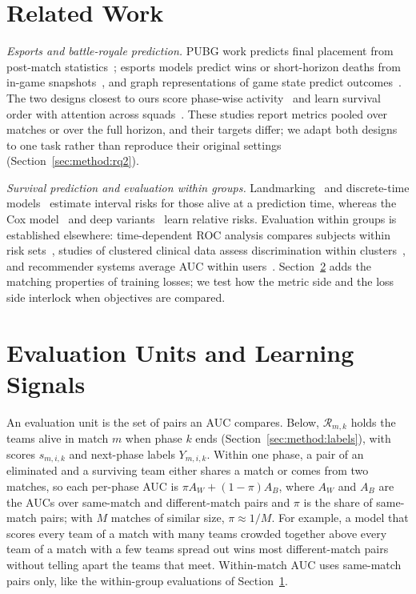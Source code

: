 \documentclass[sigconf,anonymous]{acmart}
\begin{document}
\section{Related Work}
\label{sec:related}
\emph{Esports and battle-royale prediction.} PUBG work predicts final placement from post-match statistics~\cite{KagglePUBG,LeeLee25}; esports models predict wins or short-horizon deaths from in-game snapshots~\cite{Hodge21,Katona19,Marshall22}, and graph representations of game state predict outcomes~\cite{Xenopoulos21}. The two designs closest to ours score phase-wise activity~\cite{Sagong25a} and learn survival order with attention across squads~\cite{KRAFTON}. These studies report metrics pooled over matches or over the full horizon, and their targets differ; we adapt both designs to one task rather than reproduce their original settings (Section~\ref{sec:method:rq2}).

\emph{Survival prediction and evaluation within groups.} Landmarking~\cite{vanHouwelingen07} and discrete-time models~\cite{SingerWillett93,Gensheimer19} estimate interval risks for those alive at a prediction time, whereas the Cox model~\cite{Cox72} and deep variants~\cite{DeepHit18,DynamicDeepHit20} learn relative risks. Evaluation within groups is established elsewhere: time-dependent ROC analysis compares subjects within risk sets~\cite{HeagertyZheng05}, studies of clustered clinical data assess discrimination within clusters~\cite{vanKlaveren14}, and recommender systems average AUC within users~\cite{Zhou18}. Section~\ref{sec:account} adds the matching properties of training losses; we test how the metric side and the loss side interlock when objectives are compared.

\section{Evaluation Units and Learning Signals}
\label{sec:account}
An evaluation unit is the set of pairs an AUC compares. Below, $\mathcal{R}_{m,k}$ holds the teams alive in match $m$ when phase $k$ ends (Section~\ref{sec:method:labels}), with scores $s_{m,i,k}$ and next-phase labels $Y_{m,i,k}$. Within one phase, a pair of an eliminated and a surviving team either shares a match or comes from two matches, so each per-phase AUC is $\pi A_W+(1-\pi)A_B$, where $A_W$ and $A_B$ are the AUCs over same-match and different-match pairs and $\pi$ is the share of same-match pairs; with $M$ matches of similar size, $\pi\approx1/M$. For example, a model that scores every team of a match with many teams crowded together above every team of a match with a few teams spread out wins most different-match pairs without telling apart the teams that meet. Within-match AUC uses same-match pairs only, like the within-group evaluations of Section~\ref{sec:related}.
\end{document}
